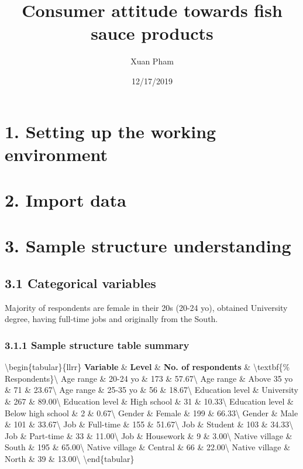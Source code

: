 \documentclass[]{article}
\title{Consumer attitude towards fish sauce products}
\author{Xuan Pham}
\date{12/17/2019}
\begin{document}
\maketitle

{
\setcounter{tocdepth}{2}
\tableofcontents
}
\hypertarget{setting-up-the-working-environment}{%
\section{1. Setting up the working
environment}\label{setting-up-the-working-environment}}

\hypertarget{import-data}{%
\section{2. Import data}\label{import-data}}

\hypertarget{sample-structure-understanding}{%
\section{3. Sample structure
understanding}\label{sample-structure-understanding}}

\hypertarget{categorical-variables}{%
\subsection{3.1 Categorical variables}\label{categorical-variables}}

Majority of respondents are female in their 20s (20-24 yo), obtained
University degree, having full-time jobs and originally from the South.

\hypertarget{sample-structure-table-summary}{%
\subsubsection{3.1.1 Sample structure table
summary}\label{sample-structure-table-summary}}

\textbackslash begin\{tabular\}\{llrr\} \toprule \textbf{Variable} \&
\textbf{Level} \& \textbf{No. of respondents} \&
\textbackslash textbf\{\% Respondents\}\textbackslash{} \midrule Age
range \& 20-24 yo \& 173 \& 57.67\textbackslash{} Age range \& Above 35
yo \& 71 \& 23.67\textbackslash{} Age range \& 25-35 yo \& 56 \&
18.67\textbackslash{} Education level \& University \& 267 \&
89.00\textbackslash{} Education level \& High school \& 31 \&
10.33\textbackslash{} \addlinespace Education level \& Below high school
\& 2 \& 0.67\textbackslash{} Gender \& Female \& 199 \&
66.33\textbackslash{} Gender \& Male \& 101 \& 33.67\textbackslash{} Job
\& Full-time \& 155 \& 51.67\textbackslash{} Job \& Student \& 103 \&
34.33\textbackslash{} \addlinespace Job \& Part-time \& 33 \&
11.00\textbackslash{} Job \& Housework \& 9 \& 3.00\textbackslash{}
Native village \& South \& 195 \& 65.00\textbackslash{} Native village
\& Central \& 66 \& 22.00\textbackslash{} Native village \& North \& 39
\& 13.00\textbackslash{} \bottomrule \textbackslash end\{tabular\}
\end{document}
